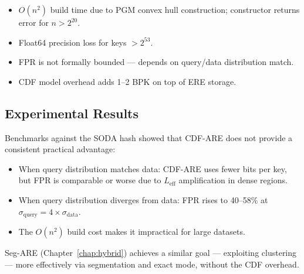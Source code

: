 \begin{itemize}
  \item $O(n^2)$ build time due to PGM convex hull construction; constructor returns
    error for $n > 2^{20}$.
  \item Float64 precision loss for keys $> 2^{53}$.
  \item FPR is not formally bounded --- depends on query/data distribution match.
  \item CDF model overhead adds 1--2 BPK on top of ERE storage.
\end{itemize}

\subsection{Experimental Results}

Benchmarks against the SODA hash showed that CDF-ARE does not provide a consistent
practical advantage:
\begin{itemize}
  \item When query distribution matches data: CDF-ARE uses fewer bits per key, but FPR
    is comparable or worse due to $L_\text{eff}$ amplification in dense regions.
  \item When query distribution diverges from data: FPR rises to 40--58\%
    at $\sigma_\text{query} = 4 \times \sigma_\text{data}$.
  \item The $O(n^2)$ build cost makes it impractical for large datasets.
\end{itemize}

Seg-ARE (Chapter~\ref{chap:hybrid}) achieves a similar goal --- exploiting
clustering --- more effectively via segmentation and exact mode, without the CDF overhead.
